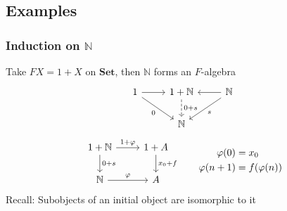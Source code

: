 \documentclass{beamer}
\begin{document}
\subsection{Examples}
\begin{frame}[fragile]
  \frametitle{Induction on $\mathbb{N}$}
  Take $FX = 1 + X$ on $\mathbf{Set}$, then $\mathbb{N}$ forms an $F$-algebra
  \begin{equation*}
    \begin{tikzcd}
      1 \rar \drar[']{0} & 1 + \mathbb{N} \dar[dashed]{0+s} & \lar \mathbb{N} \arrow[ld, "s"]\\
             & \mathbb{N}
    \end{tikzcd}
  \end{equation*}
  \pause
  \begin{equation*}
    \begin{tikzcd}
      1 + \mathbb{N} \rar{1 + \varphi} \dar{0 + s} & 1 + A \dar{x_0 + f}\\
      \mathbb{N} \rar{\varphi} & A
    \end{tikzcd}
    \qquad
    \begin{aligned}
      \varphi(0) &= x_0 \\
      \varphi(n+1) &= f(\varphi(n))
    \end{aligned}
  \end{equation*}
  Recall: Subobjects of an initial object are isomorphic to it
\end{frame}
\end{document}
